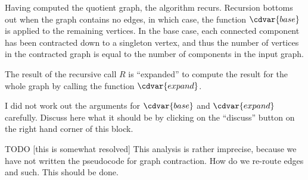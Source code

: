 \begin{algorithm}
Having computed the quotient graph, the algorithm recurs.
%
Recursion bottoms out when the graph contains no edges, in which case,
the function $\cdvar{base}$ is applied to the remaining vertices.
%
In the base case, each connected component has been contracted down to
a singleton vertex, and thus the number of vertices in the contracted
graph is equal to the number of components in the input graph.

The result of the recursive call $R$ is ``expanded'' to compute the result
for the whole graph by calling the function $\cdvar{expand}$.

\end{algorithm}

\begin{exercise}
I did not work out the arguments for $\cdvar{base}$ and $\cdvar{expand}$
carefully.  Discuss here what it should be by clicking on the ``discuss''
button on the right hand corner of this block.
\end{exercise}

\begin{teachnote}
TODO [this is somewhat resolved]
This analysis is rather imprecise, because we have not written the
pseudocode for graph contraction.  How do we re-route edges and such.
This should be done.
\end{teachnote}

